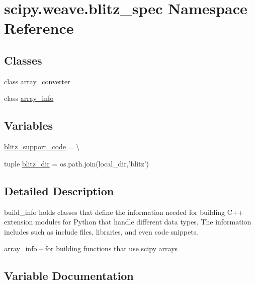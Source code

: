 \hypertarget{namespacescipy_1_1weave_1_1blitz__spec}{}\section{scipy.\+weave.\+blitz\+\_\+spec Namespace Reference}
\label{namespacescipy_1_1weave_1_1blitz__spec}
\subsection*{Classes}
\begin{DoxyCompactItemize}
\item 
class \hyperlink{classscipy_1_1weave_1_1blitz__spec_1_1array__converter}{array\+\_\+converter}
\item 
class \hyperlink{classscipy_1_1weave_1_1blitz__spec_1_1array__info}{array\+\_\+info}
\end{DoxyCompactItemize}
\subsection*{Variables}
\begin{DoxyCompactItemize}
\item 
\hyperlink{namespacescipy_1_1weave_1_1blitz__spec_a1107beb1ca8f57abb023ac5462e358b0}{blitz\+\_\+support\+\_\+code} = \textbackslash{}
\item 
tuple \hyperlink{namespacescipy_1_1weave_1_1blitz__spec_ae95e0b60b15e921a6da4621f73e367b4}{blitz\+\_\+dir} = os.\+path.\+join(local\+\_\+dir,'blitz')
\end{DoxyCompactItemize}


\subsection{Detailed Description}
\begin{DoxyVerb}    build_info holds classes that define the information
    needed for building C++ extension modules for Python that
    handle different data types.  The information includes
    such as include files, libraries, and even code snippets.

    array_info -- for building functions that use scipy arrays
\end{DoxyVerb}
 

\subsection{Variable Documentation}
\hypertarget{namespacescipy_1_1weave_1_1blitz__spec_ae95e0b60b15e921a6da4621f73e367b4}{}
